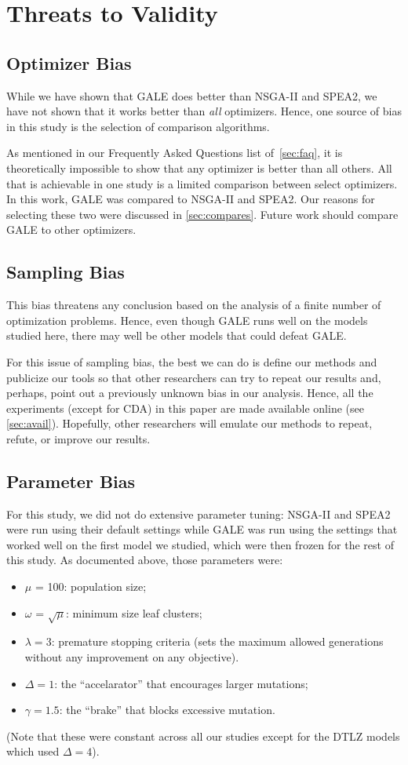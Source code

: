 \documentclass[10pt,journal,compsoc]{IEEEtran}
\newcommand{\bi}{\begin{itemize}}
\newcommand{\ei}{\end{itemize}}
\newcommand{\tion}[1]{\textsection\ref{sec:#1}}
\begin{document}
\section{Threats to Validity}


\subsection{Optimizer Bias}\label{sec:ob}
While we have shown that GALE does better than NSGA-II and SPEA2, we have not shown
that it works better than {\em all} optimizers. Hence, one source of bias in this
study is the selection of comparison algorithms.

As mentioned in our Frequently Asked Questions list of~\tion{faq}, 
it is theoretically impossible to show that any optimizer is better than all others.
All that is achievable in one study is a limited comparison between select optimizers. 
In this work, GALE was compared to 
NSGA-II and SPEA2. Our reasons for
selecting these two were discussed in
\tion{compares}.  Future work should compare GALE to other optimizers.

\subsection{ Sampling Bias}
This bias threatens any conclusion based on the
analysis of a finite number of optimization
problems.  Hence, even though GALE runs well on
the models studied here, there may well be other
models that could defeat GALE.  

For this issue of sampling bias, the best we can do
is define our methods and publicize our tools so
that other researchers can try to repeat our results
and, perhaps, point out a previously unknown bias in
our analysis. Hence, all the experiments (except for
CDA) in this paper are made available online (see \tion{avail}).  Hopefully, other
researchers will emulate our methods to repeat,
refute, or improve our results.


\subsection{Parameter Bias}
For this study, we did not do extensive parameter tuning:
NSGA-II and SPEA2 were run using their default settings
while GALE was run using the settings that worked well on the first model we
studied, which were then frozen for the
rest of this study. As documented above, those parameters were:
\bi
\item $\mu$ = 100:  population size;
\item $\omega$ = $\sqrt{\mu}$: minimum size leaf clusters;
\item $\lambda = 3$: premature stopping criteria (sets the
maximum allowed 
generations without
any improvement on any objective).
\item   $\Delta=1$: the ``accelarator'' that encourages larger mutations;
\item  $\gamma=1.5$: the ``brake'' that blocks excessive mutation.
\ei
(Note that these were constant across all our studies except for the DTLZ models which used
$\Delta=4$).
\end{document}
